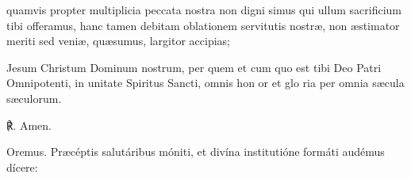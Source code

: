 \par
{}
 quamvis propter multiplicia peccata nostra non digni simus qui ullum sacrificium tibi offeramus, hanc tamen debitam oblationem servitutis nostræ, non æstimator meriti sed veniæ, quæsumus, largitor accipias;
\par
{}
 Jesum Christum Dominum nostrum, per {} quem et cum {} quo est tibi Deo Patri Omnipotenti, in unitate Spiritus {} Sancti, omnis hon {} or et glo {} ria per omnia sæcula sæculorum.\par
℟. Amen.


\par\noindent
Oremus. Præcéptis salutáribus móniti, et divína institutióne formáti audémus dícere:

